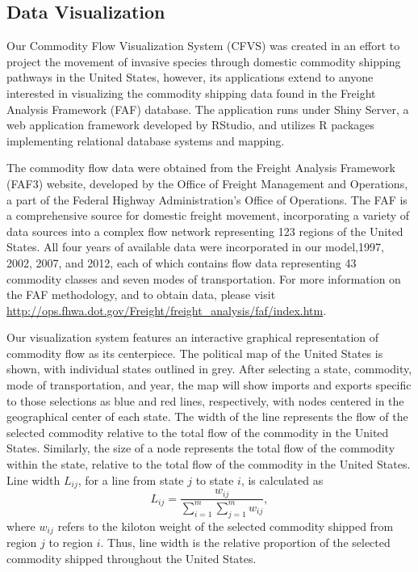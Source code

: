 \documentclass[12pt]{article}
\begin{document}
\subsection*{Data Visualization}

Our Commodity Flow Visualization System (CFVS)  was created in an effort to project the movement of invasive species through domestic commodity shipping pathways in the United States, however, its applications extend to anyone interested in visualizing the commodity shipping data found in the Freight Analysis Framework (FAF) database.  The application runs under Shiny Server, a web application framework developed by RStudio, and utilizes R packages implementing relational database systems and mapping.

The commodity flow data were obtained from the Freight Analysis Framework (FAF3) website, developed by the Office of Freight Management and Operations, a part of the Federal Highway Administration's Office of Operations.  The FAF is a comprehensive source for domestic freight movement, incorporating a variety of data sources into a complex flow network representing 123 regions of the United States.  All four years of available data were incorporated in our model,1997, 2002, 2007, and 2012, each of which contains flow data representing 43 commodity classes and seven modes of transportation.  For more information on the FAF methodology, and to obtain data, please visit \url{http://ops.fhwa.dot.gov/Freight/freight_analysis/faf/index.htm}.

Our visualization system features an interactive graphical representation of commodity flow as its centerpiece. The political map of the United States is shown, with individual states outlined in grey.  After selecting a state, commodity, mode of transportation, and year, the map will show imports and exports specific to those selections as blue and red lines, respectively, with nodes centered in the geographical center of each state.  The width of the line represents the flow of the selected commodity relative to the total flow of the commodity in the United States. Similarly, the size of a node represents the total flow of the commodity within the state, relative to the total flow of the commodity in the United States. Line width $L_{ij}$, for a line from state $j$ to state $i$, is calculated as
\[
L_{ij} = \frac{w_{ij}}{\sum_{i=1}^{m}\sum_{j=1}^{m}w_{ij}}, 
\]
where $w_{ij}$ refers to the kiloton weight of the selected commodity shipped from region $j$ to region $i$.  Thus, line width is the relative proportion of the selected commodity shipped throughout the United States.
\end{document}
